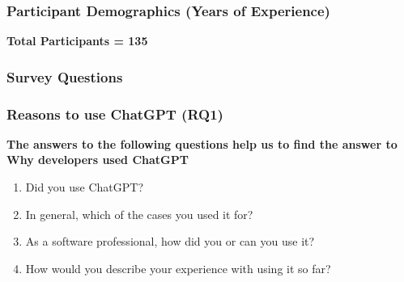 \begin{frame}
    \frametitle{Participant Demographics (Years of Experience)}
    \vspace{0.5cm}
        
        \vspace{1em} %
        \begin{center}
            \textbf{Total Participants = 135}
        \end{center}
\end{frame}




\begin{frame}
    \frametitle{Survey Questions}
    {\scriptsize
        
    }
\end{frame}


\begin{frame}
    \frametitle{Reasons to use ChatGPT (RQ1)}
    \textbf{The answers to the following questions help us to find the answer to Why developers used ChatGPT}
    \vspace{1cm}
    \begin{enumerate}
        \item Did you use ChatGPT?
        \item In general, which of the cases you used it for?
        \item As a software professional, how did you or can you use it? 
        \item How would you describe your experience with using it so far? 
    \end{enumerate}

\end{frame}

